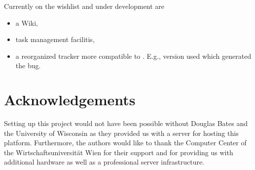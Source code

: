 Currently on the wishlist and under development are
\begin{itemize}
\item a Wiki,
\item task management facilitis,
\item a reorganized tracker more compatible to \R{}. E.g., \R{}
  version used which generated the bug.
\end{itemize}

\section{Acknowledgements}

Setting up this project would not have been possible without Douglas
Bates and the University of Wisconsin as they provided us with a
server for hosting this platform. Furthermore, 
the authors would like to thank the Computer Center 
of the Wirtschaftsuniversit\"at Wien for
their support and for providing us with additional hardware as well as a
professional server infrastructure.

